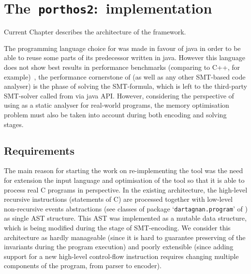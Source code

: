 \chapter{The~\texttt{porthos2}:~implementation}
\label{ch:impl}



Current Chapter describes the architecture of the \porthos[2] framework.

The programming language choice for \porthos[2] was made in favour of java in order to be able to reuse some parts of its predecessor \porthos written in java.
However this language does not show best results in performance benchmarks (comparing to C++, for example)~\cite{TODO}, the performance cornerstone of \porthos[2] (as well as any other SMT-based code analyser) is the phase of solving the SMT-formula, which is left to the third-party SMT-solver called from \porthos[2] via java API.
However, considering the perspective of using \porthos[2] as a static analyser for real-world programs, the memory optimisation problem must also be taken into account during both encoding and solving stages.


\section{Requirements}
\label{ch:impl:req}

The main reason for starting the work on re-implementing the \porthos tool was the need for extension the input language and optimisation of the tool so that it is able to process real C programs in perspective.
In the existing \porthos architecture, the high-level recursive instructions (statements of C) are processed together with low-level non-recursive events abstractions (see classes of package `\texttt{dartagnan.program}' of \porthos) as single AST structure.
This AST was implemented as a mutable data structure, which is being modified during the stage of SMT-encoding.
We consider this architecture as hardly manageable (since it is hard to guarantee preserving of the invariants during the program execution) and poorly extensible (since adding support for a new high-level control-flow instruction requires changing multiple components of the program, from parser to encoder).


